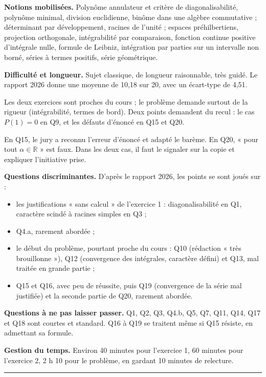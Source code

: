 \documentclass[11pt,a4paper]{article}
\providecommand{\tightlist}{\setlength{\itemsep}{0pt}\setlength{\parskip}{0pt}}
\begin{document}
\textbf{Notions mobilisées.} Polynôme annulateur et critère de diagonalisabilité, polynôme minimal, division euclidienne, binôme dans une algèbre commutative ; déterminant par développement, racines de l'unité ; espaces préhilbertiens, projection orthogonale, intégrabilité par comparaison, fonction continue positive d'intégrale nulle, formule de Leibniz, intégration par parties sur un intervalle non borné, séries à termes positifs, série géométrique.

\textbf{Difficulté et longueur.} Sujet classique, de longueur raisonnable, très guidé. Le rapport 2026 donne une moyenne de 10,18 sur 20, avec un écart-type de 4,51.

Les deux exercices sont proches du cours ; le problème demande surtout de la rigueur (intégrabilité, termes de bord). Deux points demandent du recul : le cas \(P(1)=0\) en Q9, et les défauts d'énoncé en Q15 et Q20.

En Q15, le jury a reconnu l'erreur d'énoncé et adapté le barème. En Q20, « pour tout \(\alpha\in\mathbb R\) » est faux. Dans les deux cas, il faut le signaler sur la copie et expliquer l'initiative prise.

\textbf{Questions discriminantes.} D'après le rapport 2026, les points se sont joués sur :

\begin{itemize}
\tightlist
\item
  les justifications « sans calcul » de l'exercice 1 : diagonalisabilité en Q1, caractère scindé à racines simples en Q3 ;
\item
  Q4.a, rarement abordée ;
\item
  le début du problème, pourtant proche du cours : Q10 (rédaction « très brouillonne »), Q12 (convergence des intégrales, caractère défini) et Q13, mal traitée en grande partie ;
\item
  Q15 et Q16, avec peu de réussite, puis Q19 (convergence de la série mal justifiée) et la seconde partie de Q20, rarement abordée.
\end{itemize}

\textbf{Questions à ne pas laisser passer.} Q1, Q2, Q3, Q4.b, Q5, Q7, Q11, Q14, Q17 et Q18 sont courtes et standard. Q16 à Q19 se traitent même si Q15 résiste, en admettant sa formule.

\textbf{Gestion du temps.} Environ 40 minutes pour l'exercice 1, 60 minutes pour l'exercice 2, 2 h 10 pour le problème, en gardant 10 minutes de relecture.

\begin{center}\rule{0.5\linewidth}{0.5pt}\end{center}
\end{document}
